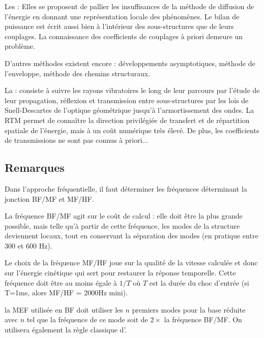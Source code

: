 \bigskip
Les : 
Elles se proposent de pallier les insuffisances de la méthode de diffusion de l'énergie
en donnant une représentation locale des phénomènes. Le bilan de puissance est
écrit aussi bien à l'intérieur des sous-structures que de leurs couplages.
La connaissance des coefficients de couplages à priori demeure un problème.

\bigskip
D'autres méthodes existent encore : développements asymptotiques,
méthode de l'enveloppe, méthode des chemins structuraux.

La : 
consiste à suivre les rayons vibratoires le long
de leur parcours par l'étude de leur propagation, réflexion et transmission
entre sous-structures par les lois de Snell-Descartes 
de l'optique géométrique jusqu'à l'armortissement des ondes.
La RTM permet de connaître la direction privilégiée de transfert et de
répartition spatiale de l'énergie, mais à un coût numérique très
élevé. De plus, les coefficients de transmissions ne sont pas connus à priori...

\medskip
\subsection{Remarques}

Dans l'approche fréquentielle, il faut déterminer les fréquences déterminant
la jonction BF/MF et MF/HF.

La fréquence BF/MF agit sur le coût de calcul : elle doit être la plus grande possible, mais
telle qu'à partir de cette fréquence, les modes de la structure deviennent locaux, 
tout en conservant la séparation des modes (en pratique entre 300 et 600 Hz).

Le choix de la fréquence MF/HF joue sur la qualité de la vitesse calculée
et donc sur l'énergie cinétique qui sert pour restaurer la réponse
temporelle. Cette fréquence doit être au moins égale à $1/T$ où
$T$ est la durée du choc d'entrée (si T=1ms, alors MF/HF = 2000Hz mini).

la MEF utilisée en BF doit utiliser les $n$ premiers modes pour la base réduite
avec $n$ tel que la fréquence de ce mode soit de $2\times$ la fréquence BF/MF.
On utilisera également la règle classique d'.

